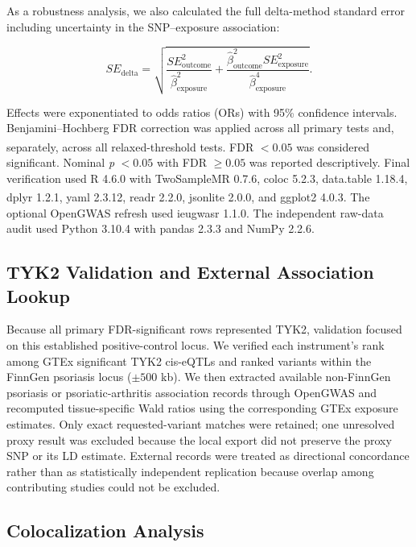 As a robustness analysis, we also calculated the full delta-method standard error including uncertainty in the SNP--exposure association:

\begin{equation}
SE_{\mathrm{delta}} =
\sqrt{\frac{SE_{\mathrm{outcome}}^2}{\hat{\beta}_{\mathrm{exposure}}^2}
+ \frac{\hat{\beta}_{\mathrm{outcome}}^2SE_{\mathrm{exposure}}^2}
{\hat{\beta}_{\mathrm{exposure}}^4}}.
\label{eq:se-delta}
\end{equation}

Effects were exponentiated to odds ratios (ORs) with 95\% confidence intervals. Benjamini--Hochberg FDR correction was applied across all primary tests and, separately, across all relaxed-threshold tests.\textsuperscript{\cite{benjamini1995fdr}} FDR $<0.05$ was considered significant. Nominal \textit{p} $<0.05$ with FDR $\geq0.05$ was reported descriptively. Final verification used R 4.6.0 with TwoSampleMR 0.7.6, coloc 5.2.3, data.table 1.18.4, dplyr 1.2.1, yaml 2.3.12, readr 2.2.0, jsonlite 2.0.0, and ggplot2 4.0.3.\textsuperscript{\cite{hemani2018twosamplemr}} The optional OpenGWAS refresh used ieugwasr 1.1.0. The independent raw-data audit used Python 3.10.4 with pandas 2.3.3 and NumPy 2.2.6.

\subsection*{TYK2 Validation and External Association Lookup}

Because all primary FDR-significant rows represented TYK2, validation focused on this established positive-control locus. We verified each instrument's rank among GTEx significant TYK2 cis-eQTLs and ranked variants within the FinnGen psoriasis locus ($\pm500$ kb). We then extracted available non-FinnGen psoriasis or psoriatic-arthritis association records through OpenGWAS and recomputed tissue-specific Wald ratios using the corresponding GTEx exposure estimates. Only exact requested-variant matches were retained; one unresolved proxy result was excluded because the local export did not preserve the proxy SNP or its LD estimate. External records were treated as directional concordance rather than as statistically independent replication because overlap among contributing studies could not be excluded.

\subsection*{Colocalization Analysis}

